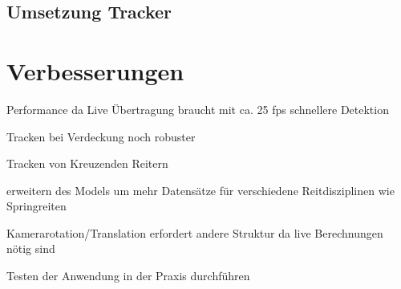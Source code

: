 \subsection*{Umsetzung Tracker}

\section{Verbesserungen}
Performance da Live Übertragung braucht mit ca. 25 fps schnellere Detektion

Tracken bei Verdeckung noch robuster

Tracken von Kreuzenden Reitern

erweitern des Models um mehr Datensätze für verschiedene Reitdisziplinen wie Springreiten

Kamerarotation/Translation erfordert andere Struktur da live Berechnungen nötig sind

Testen der Anwendung in der Praxis durchführen
